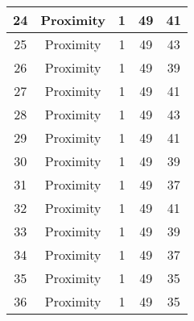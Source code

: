 \documentclass[results.tex]{subfiles}
\begin{document}
\begin{center}
\begin{tabular}{| c || c | c | c | c |}
            \hline
            24                      & Proximity                    & 1                      & 49                      & 41                   \\
            \hline
            25                      & Proximity                    & 1                      & 49                      & 43                   \\
            \hline
            26                      & Proximity                    & 1                      & 49                      & 39                   \\
            \hline
            27                      & Proximity                    & 1                      & 49                      & 41                   \\
            \hline
            28                      & Proximity                    & 1                      & 49                      & 43                   \\
            \hline
            29                      & Proximity                    & 1                      & 49                      & 41                   \\
            \hline
            30                      & Proximity                    & 1                      & 49                      & 39                   \\
            \hline
            31                      & Proximity                    & 1                      & 49                      & 37                   \\
            \hline
            32                      & Proximity                    & 1                      & 49                      & 41                   \\
            \hline
            33                      & Proximity                    & 1                      & 49                      & 39                   \\
            \hline
            34                      & Proximity                    & 1                      & 49                      & 37                   \\
            \hline
            35                      & Proximity                    & 1                      & 49                      & 35                   \\
            \hline
            36                      & Proximity                    & 1                      & 49                      & 35                   \\

\end{tabular}
\end{center}
\end{document}
